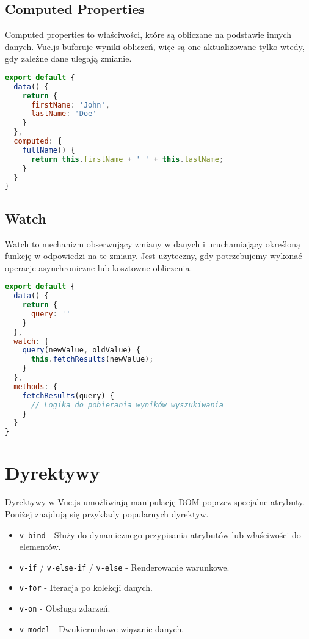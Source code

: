 \documentclass[a4paper,12pt]{article}
\begin{document}
\subsection{Computed Properties}
Computed properties to właściwości, które są obliczane na podstawie innych danych. Vue.js buforuje wyniki obliczeń, więc są one aktualizowane tylko wtedy, gdy zależne dane ulegają zmianie.

\begin{lstlisting}[language=JavaScript, caption=Przykład computed properties]
export default {
  data() {
    return {
      firstName: 'John',
      lastName: 'Doe'
    }
  },
  computed: {
    fullName() {
      return this.firstName + ' ' + this.lastName;
    }
  }
}
\end{lstlisting}

\subsection{Watch}
Watch to mechanizm obserwujący zmiany w danych i uruchamiający określoną funkcję w odpowiedzi na te zmiany. Jest użyteczny, gdy potrzebujemy wykonać operacje asynchroniczne lub kosztowne obliczenia.

\begin{lstlisting}[language=JavaScript, caption=Przykład watch]
export default {
  data() {
    return {
      query: ''
    }
  },
  watch: {
    query(newValue, oldValue) {
      this.fetchResults(newValue);
    }
  },
  methods: {
    fetchResults(query) {
      // Logika do pobierania wyników wyszukiwania
    }
  }
}
\end{lstlisting}

\section{Dyrektywy}
Dyrektywy w Vue.js umożliwiają manipulację DOM poprzez specjalne atrybuty. Poniżej znajdują się przykłady popularnych dyrektyw.

\begin{itemize}
    \item \texttt{v-bind} - Służy do dynamicznego przypisania atrybutów lub właściwości do elementów.
    \item \texttt{v-if} / \texttt{v-else-if} / \texttt{v-else} - Renderowanie warunkowe.
    \item \texttt{v-for} - Iteracja po kolekcji danych.
    \item \texttt{v-on} - Obsługa zdarzeń.
    \item \texttt{v-model} - Dwukierunkowe wiązanie danych.
\end{itemize}
\end{document}
